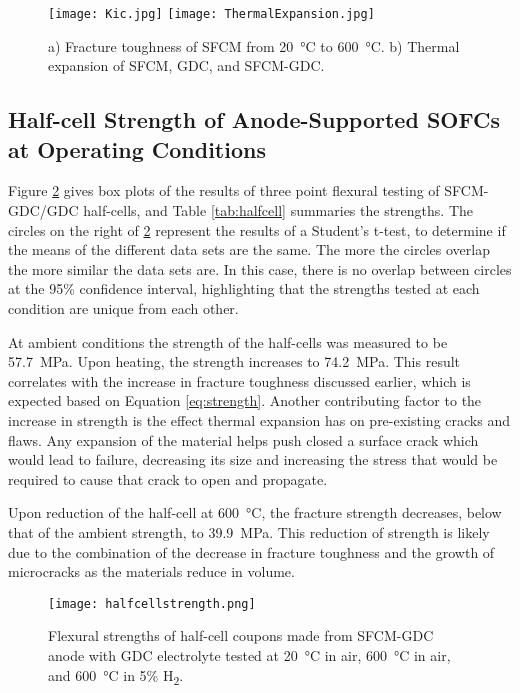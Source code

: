         \begin{figure}
            \texttt{[image: Kic.jpg]}
            \texttt{[image: ThermalExpansion.jpg]}
            \caption{a) Fracture toughness of SFCM from \SI{20}{\celsius} to \SI{600}{\celsius}. b) Thermal expansion of SFCM, GDC, and SFCM-GDC.}
            \label{fig:Kic}
        \end{figure}

    \subsection{Half-cell Strength of Anode-Supported SOFCs at Operating Conditions}
        Figure \ref{fig:InSituBox} gives box plots of the results of three point flexural testing of SFCM-GDC/GDC half-cells, and Table \ref{tab:halfcell} summaries the strengths.
        The circles on the right of \ref{fig:InSituBox} represent the results of a Student's t-test, to determine if the means of the different data sets are the same.
        The more the circles overlap the more similar the data sets are.
        In this case, there is no overlap between circles at the 95\% confidence interval, highlighting that the strengths tested at each condition are unique from each other.

        At ambient conditions the strength of the half-cells was measured to be \SI{57.7}{\mega\pascal}.
        Upon heating, the strength increases to \SI{74.2}{\mega\pascal}.
        This result correlates with the increase in fracture toughness discussed earlier, which is expected based on Equation \ref{eq:strength}.
        Another contributing factor to the increase in strength is the effect thermal expansion has on pre-existing cracks and flaws.
        Any expansion of the material helps push closed a surface crack which would lead to failure, decreasing its size and increasing the stress that would be required to cause that crack to open and propagate.

        Upon reduction of the half-cell at \SI{600}{\celsius}, the fracture strength decreases, below that of the ambient strength, to \SI{39.9}{\mega\pascal}.
        This reduction of strength is likely due to the combination of the decrease in fracture toughness and the growth of microcracks as the materials reduce in volume.

        \begin{figure}
          \texttt{[image: halfcellstrength.png]}
          \caption{Flexural strengths of half-cell coupons made from SFCM-GDC anode with GDC electrolyte tested at \SI{20}{\celsius} in air, \SI{600}{\celsius} in air, and \SI{600}{\celsius} in 5\% H\textsubscript{2}.}
          \label{fig:InSituBox}
        \end{figure}

